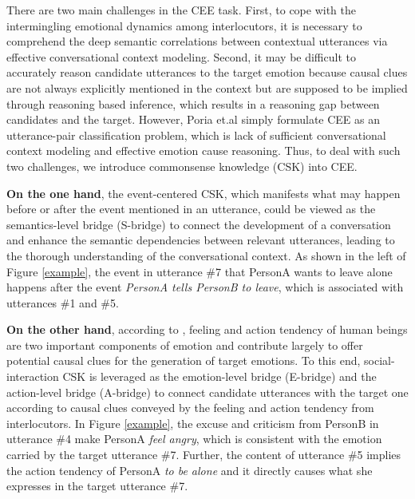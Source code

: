 \documentclass[letterpaper]{article} \usepackage{aaai23}  \usepackage{times}  \usepackage{helvet}  \usepackage{courier}  \usepackage[hyphens]{url}  \usepackage{graphicx} \urlstyle{rm} \def\UrlFont{\rm}  \usepackage{natbib}  \usepackage{caption} \frenchspacing  \setlength{\pdfpagewidth}{8.5in} \setlength{\pdfpageheight}{11in} \usepackage{algorithm}
\begin{document}
There are two main challenges in the CEE task. First, to cope with the intermingling emotional dynamics among interlocutors, it is necessary to comprehend the deep semantic correlations between contextual utterances via effective conversational context modeling. Second, it may be difficult to accurately reason candidate utterances to the target emotion because causal clues are not always explicitly mentioned in the context but are supposed to be implied through reasoning based inference, which results in a reasoning gap between candidates and the target. However, Poria et.al  simply formulate CEE as an utterance-pair classification problem, which is lack of sufficient conversational context modeling and effective emotion cause reasoning. Thus, to deal with such two challenges, we introduce commonsense knowledge (CSK) \cite{csk} into CEE.



\textbf{On the one hand}, the event-centered CSK, which manifests what may happen before or after the event mentioned in an utterance, could be viewed as the semantics-level bridge (S-bridge) to connect the development of a conversation and enhance the semantic dependencies between relevant utterances, leading to the thorough understanding of the conversational context. As shown in the left of Figure \ref{example}, the event in utterance $\#$7 that PersonA wants to leave alone happens after the event \emph{PersonA tells PersonB to leave}, which is associated with utterances $\#$1 and $\#$5.

\textbf{On the other hand}, according to \cite{theory}, feeling and action tendency of human beings are two important components of emotion and contribute largely to offer potential causal clues for the generation of target emotions. To this end, social-interaction CSK is leveraged as the emotion-level bridge (E-bridge) and the action-level bridge (A-bridge) to connect candidate utterances with the target one according to causal clues conveyed by the feeling and action tendency from interlocutors. In Figure \ref{example}, the excuse and criticism from PersonB in utterance $\#$4 make PersonA \emph{feel angry}, which is consistent with the emotion carried by the target utterance $\#$7. Further, the content of utterance $\#$5 implies the action tendency of PersonA \emph{to be alone} and it directly causes what she expresses in the target utterance $\#$7.
\end{document}
